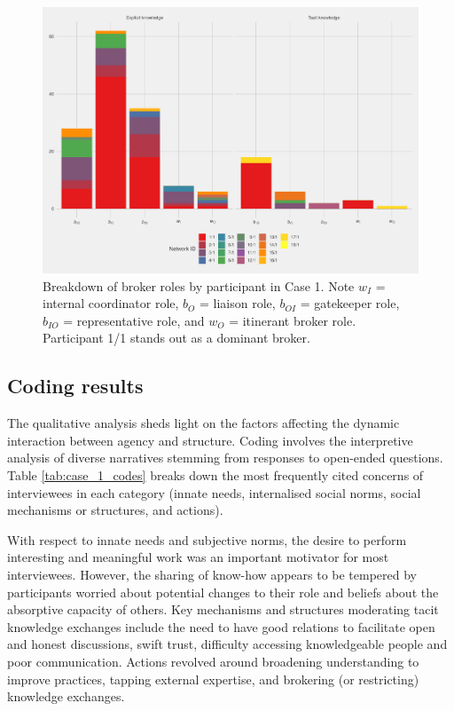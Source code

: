 \begin{figure}
\centering
\includegraphics[width = \textwidth]{Images/gf_case1.pdf}
\caption[Breakdown of broker roles by participant in Case 1]{Breakdown of broker roles by participant in Case 1. Note $w_I$ = internal coordinator role, $b_O$ = liaison role, $b_{OI}$ = gatekeeper role, $b_{IO}$ = representative role, and $w_O$ = itinerant broker role. Participant 1/1 stands out as a dominant broker.}
\label{fig:gf_c1}
\end{figure}

\subsection{Coding results}

The qualitative analysis sheds light on the factors affecting the dynamic interaction between agency and structure. Coding involves the interpretive analysis of diverse narratives stemming from responses to open-ended questions. Table \ref{tab:case_1_codes} breaks down the most frequently cited concerns of interviewees in each category (innate needs, internalised social norms, social mechanisms or structures, and actions). \medskip

With respect to innate needs and subjective norms, the desire to perform interesting and meaningful work was an important motivator for most interviewees. However, the sharing of know-how appears to be tempered by participants worried about potential changes to their role and beliefs about the absorptive capacity of others. Key mechanisms and structures moderating tacit knowledge exchanges include the need to have good relations to facilitate open and honest discussions, swift trust, difficulty accessing knowledgeable people and poor communication. Actions revolved around broadening understanding to improve practices, tapping external expertise, and brokering (or restricting) knowledge exchanges. 

